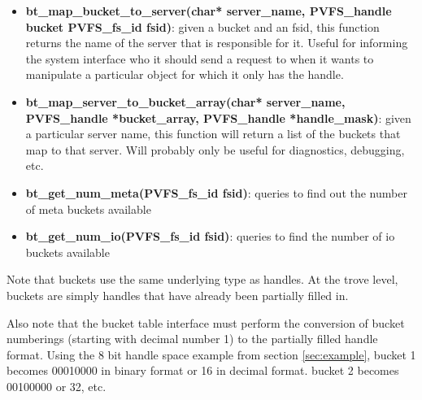 \documentclass[12pt]{article} %
\begin{document}
\begin{itemize}
\item \textbf{bt\_map\_bucket\_to\_server(char* server\_name,
PVFS\_handle bucket PVFS\_fs\_id fsid)}:
given a bucket and an fsid, this function returns the name of the server
that is responsible for it.  Useful for informing the system interface
who it should send a request to when it wants to manipulate a particular
object for which it only has the handle.
\item \textbf{bt\_map\_server\_to\_bucket\_array(char* server\_name,
PVFS\_handle *bucket\_array, PVFS\_handle *handle\_mask)}: given a particular server name, this function will
return a list of the buckets that map to that server.
Will probably only be useful for diagnostics, debugging, etc.
\item \textbf{bt\_get\_num\_meta(PVFS\_fs\_id fsid)}: queries to
find out the number of meta buckets available
\item \textbf{bt\_get\_num\_io(PVFS\_fs\_id fsid)}:
queries to find the number of io buckets available
\end{itemize}

Note that buckets use the same underlying type as handles.  At the trove
level, buckets are simply handles that have already been partially filled in.

Also note that the bucket table interface must perform the conversion of
bucket numberings (starting with decimal number 1) to the partially
filled handle format.  Using the 8 bit handle space example from section
\ref{sec:example}, bucket 1 becomes 00010000 in binary format or 16 in
decimal format.  bucket 2 becomes 00100000 or 32, etc.
\end{document}
